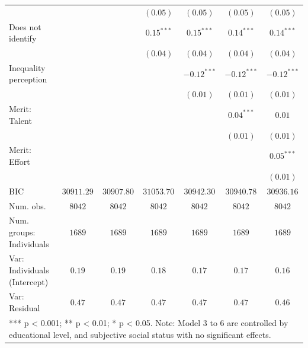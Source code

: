 \documentclass[
  12pt,
  a4paper,
]{article}
\begin{document}
\begin{table}[!ht]
\begin{center}
{\begin{tabular}{l c c c c c c}
                                    &               &               & $(0.05)$      & $(0.05)$      & $(0.05)$      & $(0.05)$      \\
\quad Does not identify             &               &               & $0.15^{***}$  & $0.15^{***}$  & $0.14^{***}$  & $0.14^{***}$  \\
                                    &               &               & $(0.04)$      & $(0.04)$      & $(0.04)$      & $(0.04)$      \\
Inequality perception               &               &               &               & $-0.12^{***}$ & $-0.12^{***}$ & $-0.12^{***}$ \\
                                    &               &               &               & $(0.01)$      & $(0.01)$      & $(0.01)$      \\
Merit: Talent                       &               &               &               &               & $0.04^{***}$  & $0.01$        \\
                                    &               &               &               &               & $(0.01)$      & $(0.01)$      \\
Merit: Effort                       &               &               &               &               &               & $0.05^{***}$  \\
                                    &               &               &               &               &               & $(0.01)$      \\
\hline
BIC                                 & $30911.29$    & $30907.80$    & $31053.70$    & $30942.30$    & $30940.78$    & $30936.16$    \\
Num. obs.                           & $8042$        & $8042$        & $8042$        & $8042$        & $8042$        & $8042$        \\
Num. groups: Individuals            & $1689$        & $1689$        & $1689$        & $1689$        & $1689$        & $1689$        \\
Var: Individuals (Intercept)        & $0.19$        & $0.19$        & $0.18$        & $0.17$        & $0.17$        & $0.16$        \\
Var: Residual                       & $0.47$        & $0.47$        & $0.47$        & $0.47$        & $0.47$        & $0.46$        \\
\hline
\multicolumn{7}{l}{\scriptsize{*** p < 0.001; ** p < 0.01; * p < 0.05.
Note: Model 3 to 6 are controlled by educational level, and subjective social status with no significant effects.}}
\end{tabular}
}
\label{table:coefficients}
\end{center}
\end{table}
\end{document}
